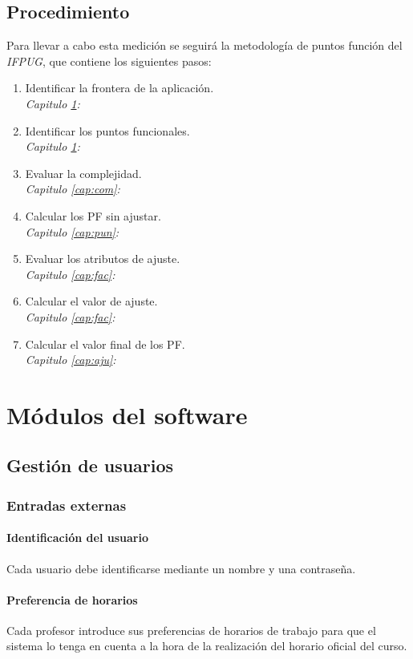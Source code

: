 \documentclass[11pt,a4paper,spanish,twoside]{book}
\begin{document}
\section*{Procedimiento}
Para llevar a cabo esta medición se seguirá la metodología de puntos función
del \emph{IFPUG}, que contiene los siguientes pasos:
\begin{enumerate}
\item Identificar la frontera de la aplicación. \\
  \emph{Capitulo \ref{cap:mod}: }
\item Identificar los puntos funcionales. \\
  \emph{Capitulo \ref{cap:mod}: }
\item Evaluar la complejidad. \\
  \emph{Capitulo \ref{cap:com}: }
\item Calcular los PF sin ajustar. \\
  \emph{Capitulo \ref{cap:pun}: } 
\item Evaluar los atributos de ajuste. \\ 
  \emph{Capitulo \ref{cap:fac}: } 
\item Calcular el valor de ajuste. \\
  \emph{Capitulo \ref{cap:fac}: } 
\item Calcular el valor final de los PF. \\
  \emph{Capitulo \ref{cap:aju}: }
\end{enumerate}

\chapter{Módulos del software} \label{cap:mod}
\section{Gestión de usuarios}
\subsection{Entradas externas}
\subsubsection{Identificación del usuario}
Cada usuario debe identificarse mediante un nombre y una contraseña.

\subsubsection{Preferencia de horarios} 
Cada profesor introduce sus preferencias de horarios de trabajo para que el
sistema lo tenga en cuenta a la hora de la realización del horario oficial
del curso.
\end{document}
